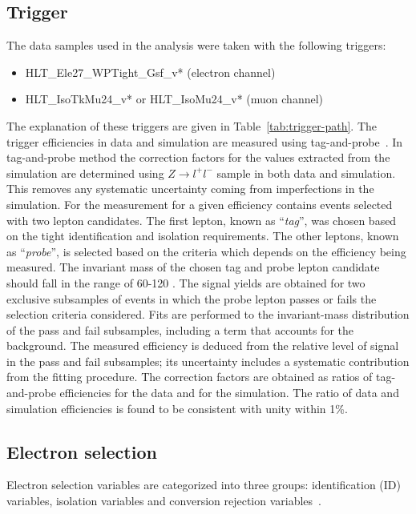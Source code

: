 \subsection{Trigger}
\label{subsec:trigger}
The data samples used in the analysis were taken with the following triggers:
\begin{itemize}
\item HLT\_Ele27\_WPTight\_Gsf\_v* (electron channel)
\item HLT\_IsoTkMu24\_v* or  HLT\_IsoMu24\_v* (muon channel)
\end{itemize}
The explanation of these triggers are given in Table~\ref{tab:trigger-path}. The trigger efficiencies in data and simulation are measured using tag-and-probe~\cite{Tag_probe}. In tag-and-probe method the correction factors  for the values extracted from the simulation are determined using $Z \rightarrow l^+ l^-$ sample in both data and simulation. This removes any systematic uncertainty coming from imperfections in the simulation. For the measurement for a given efficiency contains events selected with two lepton candidates. The first lepton, known as ``\textit{tag}'', was chosen based on the tight identification and isolation requirements. The other leptons, known as ``\textit{probe}'', is selected based on the criteria which depends on the efficiency being measured. The invariant mass of the chosen tag and probe lepton candidate should fall in the range of 60-120 \GeV. The signal yields are obtained for two exclusive subsamples of events in which the probe lepton passes or fails the selection criteria considered. Fits are performed to the invariant-mass distribution of the pass and fail subsamples, including a term that accounts for the background. The measured efficiency is deduced from the relative level of signal in the pass and fail subsamples; its uncertainty includes a systematic contribution from the fitting procedure. The correction factors are obtained as ratios of tag-and-probe efficiencies for the data and for the simulation. The ratio of data and simulation efficiencies is found to be consistent with unity within 1\%.


\subsection{Electron selection}
\label{subsec:electrons}
Electron selection variables are categorized into three groups: identification (ID) variables, isolation variables and conversion rejection variables~\cite{ElectronReconstruction_8TeV_cms,Novakova2013}.

